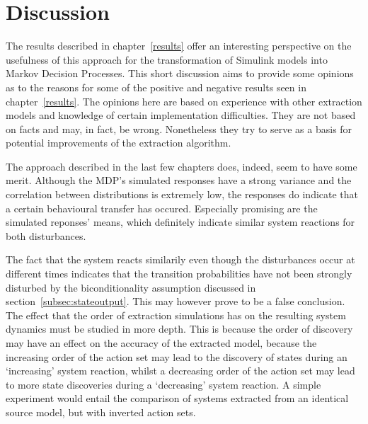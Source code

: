 \chapter{Discussion}
\label{discussion}

The results described in chapter~\ref{results} offer an interesting perspective on the usefulness of this approach for the transformation of Simulink models into Markov Decision Processes. This short discussion aims to provide some opinions as to the reasons for some of the positive and negative results seen in chapter~\ref{results}. The opinions here are based on experience with other extraction models and knowledge of certain implementation difficulties. They are not based on facts and may, in fact, be wrong. Nonetheless they try to serve as a basis for potential improvements of the extraction algorithm.

The approach described in the last few chapters does, indeed, seem to have some merit. Although the MDP's simulated responses have a strong variance and the correlation between distributions is extremely low, the responses do indicate that a certain behavioural transfer has occured. Especially promising are the simulated reponses' means, which definitely indicate similar system reactions for both disturbances.

The fact that the system reacts similarily even though the disturbances occur at different times indicates that the transition probabilities have not been strongly disturbed by the biconditionality assumption discussed in section~\ref{subsec:stateoutput}. This may however prove to be a false conclusion. The effect that the order of extraction simulations has on the resulting system dynamics must be studied in more depth. This is because the order of discovery may have an effect on the accuracy of the extracted model, because the increasing order of the action set may lead to the discovery of states during an `increasing' system reaction, whilst a decreasing order of the action set may lead to more state discoveries during a `decreasing' system reaction. A simple experiment would entail the comparison of systems extracted from an identical source model, but with inverted action sets.

